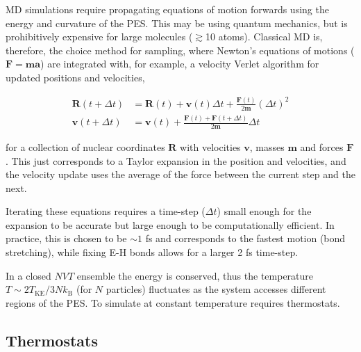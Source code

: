 \documentclass[main.tex]{subfiles}
\begin{document}
MD simulations require propagating equations of motion forwards using the energy and curvature of the PES. This may be using quantum mechanics, but is prohibitively expensive for large molecules ($\gtrsim$10 atoms).\cite{Zhang2016} Classical MD is, therefore, the choice method for sampling, where Newton's equations of motions ($\boldsymbol{F}=\boldsymbol{m}\boldsymbol{a}$) are integrated with, for example, a velocity Verlet algorithm for updated positions and velocities,


\begin{equation}
	\begin{aligned}
		\boldsymbol{R}(t+\Delta t) &= \boldsymbol{R}(t) + \boldsymbol{v}(t) \Delta t + \frac{\boldsymbol{F}(t) }{2 \boldsymbol{m}} (\Delta t)^2\\
		\boldsymbol{v}(t + \Delta t) &= \boldsymbol{v}(t)  + \frac{\boldsymbol{F}(t) + \boldsymbol{F}(t+\Delta t)}{2\boldsymbol{m}} \Delta t
	\end{aligned}
\end{equation}

for a collection of nuclear coordinates $\boldsymbol{R}$ with velocities $\boldsymbol{v}$, masses $\boldsymbol{m}$ and forces $\boldsymbol{F}$. This just corresponds to a Taylor expansion in the position and velocities, and the velocity update uses the average of the force between the current step and the next.

Iterating these equations requires a time-step ($\Delta t$) small enough for the expansion to be accurate but large enough to be computationally efficient. In practice, this is chosen to be $\sim 1$ fs and corresponds to the fastest motion (bond stretching), while fixing E-H bonds allows for a larger 2 fs time-step.\cite{Sweet2013}

In a closed $NVT$ ensemble the energy is conserved, thus the temperature $T \sim 2 T_\text{KE} / 3Nk_\text{B}$ (for $N$ particles) fluctuates as the system accesses different regions of the PES. To simulate at constant temperature  requires thermostats.

\subsection{Thermostats}
\end{document}
